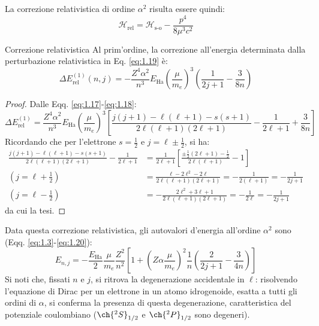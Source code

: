 La correzione relativistica di ordine $ \alpha^2 $ risulta essere quindi:
\begin{equation}
	\mathcal{H}_\text{rel} = \mathcal{H}_\text{s-o} - \frac{p^4}{8 \mu^3 c^2}
	\label{eq:1.19}
\end{equation}

\begin{proposition}{Correzione relativistica}{}
	Al prim'ordine, la correzione all'energia determinata dalla perturbazione relativistica in Eq. \ref{eq:1.19} è:
	\begin{equation}
		\Delta E_\text{rel}^{(1)}(n,j) = - \frac{Z^4 \alpha^2}{n^3} E_\text{Ha} \left( \frac{\mu}{m_e} \right)^3 \left( \frac{1}{2j + 1} - \frac{3}{8n} \right)
		\label{eq:1.20}
	\end{equation}

	\tcblower

	\begin{proof}
		Dalle Eqq. \ref{eq:1.17}-\ref{eq:1.18}:
		\begin{equation*}
			\Delta E_\text{rel}^{(1)} = \frac{Z^4 \alpha^2}{n^3} E_\text{Ha} \left( \frac{\mu}{m_e} \right)^3 \left[ \frac{j(j+1) - \ell(\ell+1) - s(s+1)}{2\ell (\ell+1) (2\ell+1)} - \frac{1}{2\ell + 1} + \frac{3}{8n} \right]
		\end{equation*}
		Ricordando che per l'elettrone $ s = \frac{1}{2} $ e $ j = \ell \pm \frac{1}{2} $, si ha:
		\begin{equation*}
			\begin{split}
				\frac{j(j+1) - \ell(\ell+1) - s(s+1)}{2\ell (\ell+1) (2\ell+1)} - \frac{1}{2\ell + 1}
				&= \frac{1}{2\ell + 1} \left[ \frac{\pm \tfrac{1}{2} (2\ell + 1) - \tfrac{1}{2}}{2\ell (\ell + 1)} - 1 \right] \\
				(j = \ell + \tfrac{1}{2}) &= \frac{\ell - 2\ell^2 - 2\ell}{2\ell (\ell + 1) (2\ell + 1)} = - \frac{1}{2 (\ell + 1)} = - \frac{1}{2j + 1} \\
				(j = \ell - \tfrac{1}{2}) &= - \frac{2\ell^2 + 3\ell + 1}{2\ell (\ell + 1) (2\ell + 1)} = - \frac{1}{2\ell} = - \frac{1}{2j + 1}
			\end{split}
		\end{equation*}
		da cui la tesi.
	\end{proof}
\end{proposition}

Data questa correzione relativistica, gli autovalori d'energia all'ordine $ \alpha^2 $ sono (Eqq. \ref{eq:1.3}-\ref{eq:1.20}):
\begin{equation}
	E_{n,j} = - \frac{E_\text{Ha}}{2} \frac{\mu}{m_e} \frac{Z^2}{n^2} \left[ 1 + \left( Z \alpha \frac{\mu}{m_e} \right)^2 \frac{1}{n} \left( \frac{2}{2j + 1} - \frac{3}{4n} \right) \right]
	\label{eq:1.21}
\end{equation}
Si noti che, fissati $ n $ e $ j $, si ritrova la degenerazione accidentale in $ \ell $: risolvendo l'equazione di Dirac per un elettrone in un atomo idrogenoide, esatta a tutti gli ordini di $ \alpha $, si conferma la presenza di questa degenerazione, caratteristica del potenziale coulombiano ($ \ch{^2S}_{1/2} $ e $ \ch{^2P}_{1/2} $ sono degeneri).


